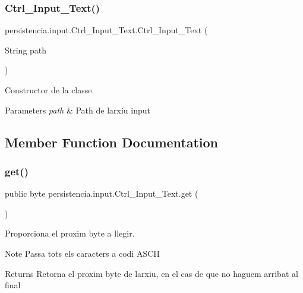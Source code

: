 \subsubsection{\texorpdfstring{Ctrl\+\_\+\+Input\+\_\+\+Text()}{Ctrl\_Input\_Text()}}
{\footnotesize\ttfamily persistencia.\+input.\+Ctrl\+\_\+\+Input\+\_\+\+Text.\+Ctrl\+\_\+\+Input\+\_\+\+Text (\begin{DoxyParamCaption}\item[{String}]{path }\end{DoxyParamCaption})\hspace{0.3cm}{\ttfamily [inline]}}



Constructor de la classe. 


\begin{DoxyParams}{Parameters}
{\em path} & Path de l\textquotesingle{}arxiu input \\
\hline
\end{DoxyParams}


\subsection{Member Function Documentation}
\mbox{\label{classpersistencia_1_1input_1_1Ctrl__Input__Text_a8b501ae723f8c6f8d63305a56e9720c3}} 
\subsubsection{\texorpdfstring{get()}{get()}}
{\footnotesize\ttfamily public byte persistencia.\+input.\+Ctrl\+\_\+\+Input\+\_\+\+Text.\+get (\begin{DoxyParamCaption}{ }\end{DoxyParamCaption})\hspace{0.3cm}{\ttfamily [inline]}}



Proporciona el proxim byte a llegir. 

\begin{DoxyNote}{Note}
Passa tots els caracters a codi A\+S\+C\+II 
\end{DoxyNote}
\begin{DoxyReturn}{Returns}
Retorna el proxim byte de l\textquotesingle{}arxiu, en el cas de que no haguem arribat al final 
\end{DoxyReturn}


